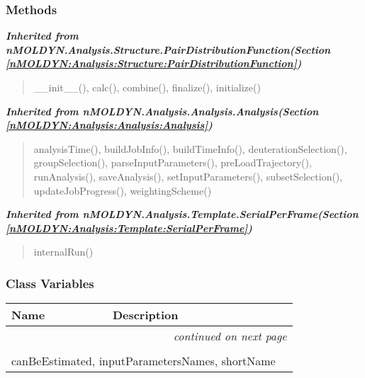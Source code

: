 
  \subsubsection{Methods}


\large{\textbf{\textit{Inherited from nMOLDYN.Analysis.Structure.PairDistributionFunction\textit{(Section \ref{nMOLDYN:Analysis:Structure:PairDistributionFunction})}}}}

\begin{quote}
\_\_init\_\_(), calc(), combine(), finalize(), initialize()
\end{quote}

\large{\textbf{\textit{Inherited from nMOLDYN.Analysis.Analysis.Analysis\textit{(Section \ref{nMOLDYN:Analysis:Analysis:Analysis})}}}}

\begin{quote}
analysisTime(), buildJobInfo(), buildTimeInfo(), deuterationSelection(), groupSelection(), parseInputParameters(), preLoadTrajectory(), runAnalysis(), saveAnalysis(), setInputParameters(), subsetSelection(), updateJobProgress(), weightingScheme()
\end{quote}

\large{\textbf{\textit{Inherited from nMOLDYN.Analysis.Template.SerialPerFrame\textit{(Section \ref{nMOLDYN:Analysis:Template:SerialPerFrame})}}}}

\begin{quote}
internalRun()
\end{quote}


  \subsubsection{Class Variables}

    \vspace{-1cm}
\hspace{\varindent}\begin{longtable}{|p{\varnamewidth}|p{\vardescrwidth}|l}
\cline{1-2}
\cline{1-2} \centering \textbf{Name} & \centering \textbf{Description}& \\
\cline{1-2}
\endhead\cline{1-2}\multicolumn{3}{r}{\small\textit{continued on next page}}\\\endfoot\cline{1-2}
\endlastfoot\multicolumn{2}{|l|}{\textit{Inherited from nMOLDYN.Analysis.Structure.PairDistributionFunction \textit{(Section \ref{nMOLDYN:Analysis:Structure:PairDistributionFunction})}}}\\
\multicolumn{2}{|p{\varwidth}|}{\raggedright canBeEstimated, inputParametersNames, shortName}\\
\cline{1-2}
\end{longtable}

